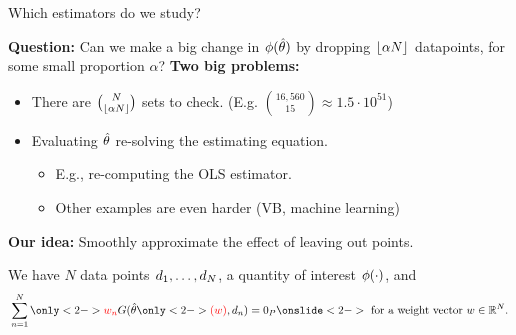
\begin{frame}[t]{Which estimators do we study?}

\textbf{Question: }
Can we make a big change in $\phi(\hat{\theta})$ by dropping
$\lfloor \alpha N \rfloor$ datapoints, for some small proportion $\alpha$?
%
\textbf{Two big problems:}
%
\begin{itemize}
    \item There are ${N \choose \lfloor \alpha N \rfloor}$
        sets to check.
        (E.g. ${16,560 \choose 15 } \approx 1.5\cdot10^{51}$)
    \item Evaluating $\hat{\theta}$ re-solving the estimating equation.
        \begin{itemize}
        \item E.g., re-computing the OLS estimator.
        \item Other examples are even harder (VB, machine learning)
        \end{itemize}
\end{itemize}
%
\textbf{Our idea: }Smoothly approximate the effect of leaving out points.

\hrulefill

We have $N$ data points $d_{1}, \ldots, d_{N}$, a quantity of interest
$\phi(\cdot)$, and
%
\begin{align*}
%
\sumn
\only<2->{\color{red} \w_n \color{black}}
G(
\thetahat\only<2->{\color{red} (\w) \color{black}}
, \d_{n}) =  \zP
\onslide<2->{\textrm{ for a weight vector }\w \in \mathbb{R}^N}.
%
\end{align*}



\end{frame}
